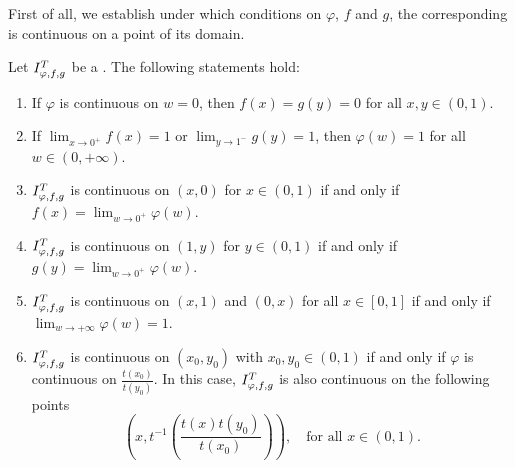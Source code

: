 First of all, we establish under which conditions on $\varphi$, $f$ and $g$, the corresponding \STP is continuous on a point of its domain.
\begin{proposition} \label{prop:strict:continuity} Let $I^T_{\varphi,f,g}$ be a \STP. The following statements hold:
	\begin{enumerate}[label=(\roman*)]
		\item If $\varphi$ is continuous on $w=0$, then $f(x)=g(y)=0$ for all $x,y \in (0,1)$.
		\item If $\displaystyle \lim_{x \to 0^+} f(x)=1$ or $\displaystyle \lim_{y \to 1^-}g(y)=1$, then $\varphi(w)=1$ for all $w \in (0,+\infty)$.
		\item $I^T_{\varphi,f,g}$ is continuous on $(x,0)$ for $x \in (0,1)$ if and only if $\displaystyle f(x)= \lim_{w \to 0^+} \varphi(w)$.
		\item $I^T_{\varphi,f,g}$ is continuous on $(1,y)$ for $y \in (0,1)$ if and only if $\displaystyle g(y)= \lim_{w \to 0^+} \varphi(w)$.
		\item $I^T_{\varphi,f,g}$ is continuous on $(x,1)$ and $(0,x)$ for all $x \in [0,1]$ if and only if $\displaystyle \lim_{w \to +\infty} \varphi(w)=1$.
		\item $I^T_{\varphi,f,g}$ is continuous on $(x_0,y_0)$ with $x_0,y_0 \in (0,1)$ if and only if $\varphi$ is continuous on $\frac{t(x_0)}{t(y_0)}$. In this case, $I^T_{\varphi,f,g}$ is also continuous on the following points
		$$\left(x,t^{-1}\left(\frac{t(x)t(y_0)}{t(x_0)}\right)\right), \quad \text{for all } x \in (0,1).$$
	\end{enumerate}
\end{proposition}
